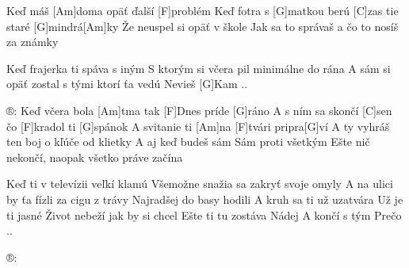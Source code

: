 
Keď máš [Am]doma opäť ďalší [F]problém
Keď fotra s [G]matkou berú [C]zas tie staré [G]mindrá[Am]ky
Že neuspel si opäť v škole
Jak sa to správaš a čo to nosíš za známky

Keď frajerka ti spáva s iným
S ktorým si včera pil minimálne do rána
A sám si opäť zostal s tými ktorí ťa vedú
Nevieš [G]Kam ..

®: Keď včera bola [Am]tma tak [F]Dnes príde [G]ráno
A s ním sa skončí [C]sen čo [F]kradol ti [G]spánok
A svitanie ti [Am] na [F]tvári pripra[G]ví
A ty vyhráš ten boj o kľúče od klietky
A aj keď budeš sám Sám proti všetkým
Ešte nič nekončí, naopak všetko práve začína

Keď ti v televízii veľkí klamú
Všemožne snažia sa zakryť svoje omyly
A na ulici by ťa fízli za cigu z trávy
Najradšej do basy hodili
A kruh sa ti už uzatvára Už je ti jasné
Život nebeží jak by si chcel
Ešte ti tu zostáva Nádej A končí s tým
Prečo ..

®: